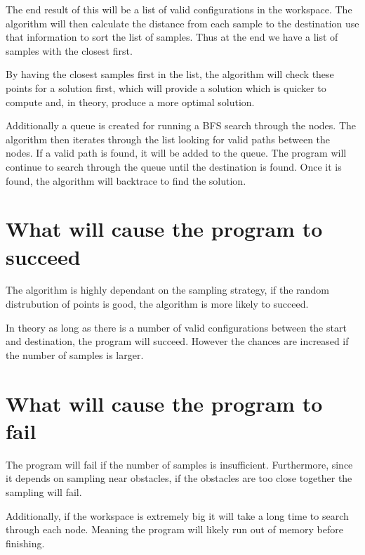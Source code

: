 \documentclass[12pt]{article}
\begin{document}
    The end result of this will be a list of valid configurations in the workspace.
    The algorithm will then calculate the distance from each sample to the destination use that information to sort the list of samples. Thus at the end we have a list of samples with the closest first.
    
    By having the closest samples first in the list, the algorithm will check these points for a solution first, which will provide a solution which is quicker to compute and, in theory, produce a more optimal solution.

    Additionally a queue is created for running a BFS search through the nodes. The algorithm then iterates through the list looking for valid paths between the nodes. If a valid path is found, it will be added to the queue.
    The program will continue to search through the queue until the destination is found. Once it is found, the algorithm will backtrace to find the solution. 

    \section{What will cause the program to succeed}

    The algorithm is highly dependant on the sampling strategy, if the random distrubution of points is good, the algorithm is more likely to succeed.

    In theory as long as there is a number of valid configurations between the start and destination, the program will succeed. However the chances are increased if the number of samples is larger.

    \section{What will cause the program to fail}

    The program will fail if the number of samples is insufficient. Furthermore, since it depends on sampling near obstacles, if the obstacles are too close together the sampling will fail.

    Additionally, if the workspace is extremely big it will take a long time to search through each node. Meaning the program will likely run out of memory before finishing.
\end{document}
